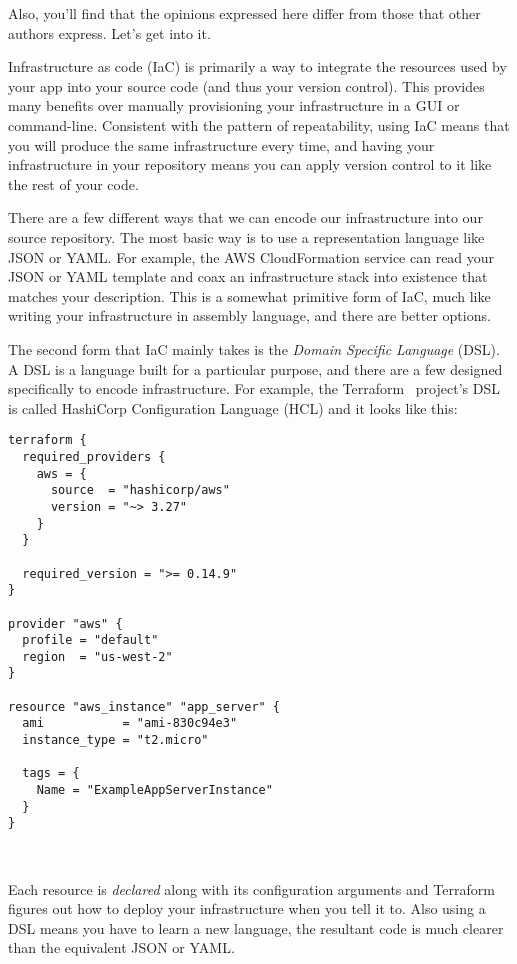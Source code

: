 \documentclass{article}
\newcommand{\noterm}[1]{\textit{#1}}
\newcommand{\term}[1]{\noterm{#1}\index{#1}}
\begin{document}
Also, you'll find that the opinions expressed here differ from those that other authors express. Let's get into it.

Infrastructure as code (IaC) is primarily a way to integrate the resources used by your app into your source code (and thus your version control).
This provides many benefits over manually provisioning your infrastructure in a GUI or command-line.
Consistent with the pattern of repeatability, using IaC means that you will produce the same infrastructure every time, and having your infrastructure in your repository means you can apply version control to it like the rest of your code.

There are a few different ways that we can encode our infrastructure into our source repository.
The most basic way is to use a representation language like JSON or YAML.
For example, the AWS CloudFormation service can read your JSON or YAML template and coax an infrastructure stack into existence that matches your description.
This is a somewhat primitive form of IaC, much like writing your infrastructure in assembly language, and there are better options.

The second form that IaC mainly takes is the \term{Domain Specific Language} (DSL).
A DSL is a language built for a particular purpose, and there are a few designed specifically to encode infrastructure.
For example, the Terraform~\cite{terraform} project's DSL is called HashiCorp Configuration Language (HCL) and it looks like this:

\begin{verbatim}
terraform {
  required_providers {
    aws = {
      source  = "hashicorp/aws"
      version = "~> 3.27"
    }
  }

  required_version = ">= 0.14.9"
}

provider "aws" {
  profile = "default"
  region  = "us-west-2"
}

resource "aws_instance" "app_server" {
  ami           = "ami-830c94e3"
  instance_type = "t2.micro"

  tags = {
    Name = "ExampleAppServerInstance"
  }
}
\end{verbatim}~\cite{terraform-example}

Each resource is \textit{declared} along with its configuration arguments and Terraform figures out how to deploy your infrastructure when you tell it to.
Also using a DSL means you have to learn a new language, the resultant code is much clearer than the equivalent JSON or YAML.
\end{document}
